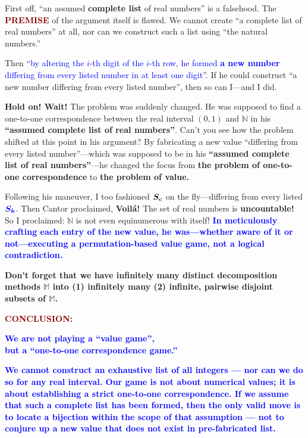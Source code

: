 \documentclass[12pt]{article}
\theoremstyle{definition} %
\numberwithin{equation}{section}
\newcommand{\darkboldred}[1]			   
{\textbf{\textcolor{darkred}{#1}}}
\newcommand{\boldblu}[1]			    {\textbf{\textcolor{blue}{#1}}}
\newcommand{\boldcolormath}[2]
{\(\bm{\textcolor{#1}{#2}}\)}
\begin{document}
\vspace{1em}
First off, ``an assumed \textbf{complete list} of real numbers'' is a falsehood. The \darkboldred{PREMISE} of the argument itself is flawed. We cannot create ``a complete list of real numbers'' at all, nor can we construct such a list using ``the natural numbers.''


\vspace{1em}
Then ``\textcolor{blue}{by altering the \( i \)-th digit of the \( i \)-th row, he formed \textbf{a new number} differing from every listed number in at least one digit}''. If he could construct ``a new number differing from every listed number'', then so can I—and I did.

\vspace{1em}
\textbf{Hold on! Wait!} The problem was suddenly changed. He was supposed to find a one-to-one correspondence between the real interval \((0, 1)\) and \(\mathbb{N}\) in his \textbf{``assumed complete list of real numbers''}. Can't you see how the problem shifted at this point in his argument? By fabricating a new value ``differing from every listed number''---which was supposed to be in his \textbf{``assumed complete list of real numbers''}---he changed the focus from \textbf{the problem of one-to-one correspondence} to \textbf{the problem of value.}

\vspace{1em}
Following his maneuver, I too fashioned \boldcolormath{black}{S_c} on the fly---differing from every listed \boldcolormath{blue}{S_k}. Then Cantor proclaimed,  
\textbf{Voilá!} The set of real numbers is \textbf{uncountable!}  
So I proclaimed: \(\mathbb{N}\) is not even equinumerous with itself! \boldblu{In meticulously crafting each entry of the new value, he was—whether aware of it or not—executing a permutation-based value game, not a logical contradiction.}

\vspace{1em}
\textbf{Don't forget that we have infinitely many distinct decomposition methods \(\mathbb{M}\) into (1) infinitely many (2) infinite, pairwise disjoint subsets of \(\mathbb{M}\).}

\vspace{1em}
\noindent \darkboldred{CONCLUSION:}
\begin{center}
\boldblu{We are not playing a “value game”,\\ but a “one-to-one correspondence game.”}
\end{center}
\vspace{0.5em}
\boldblu{We cannot construct an exhaustive list of all integers — nor can we do so for any real interval. Our game is not about numerical values; it is about establishing a strict one-to-one correspondence. If we assume that such a complete list has been formed, then the only valid move is to locate a bijection within the scope of that assumption — not to conjure up a new value that does not exist in pre-fabricated list.}
\end{document}
